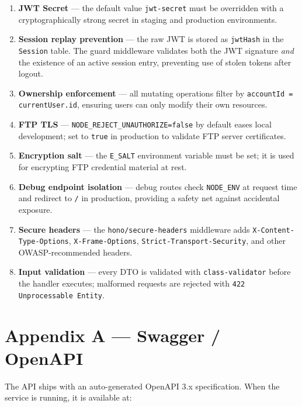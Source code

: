 \documentclass[12pt,a4paper]{article}
\begin{document}
\begin{enumerate}[label=\arabic*.]
  \item \textbf{JWT Secret} — the default value \texttt{jwt-secret} must be overridden with a cryptographically strong secret in staging and production environments.
  \item \textbf{Session replay prevention} — the raw JWT is stored as \texttt{jwtHash} in the \texttt{Session} table. The guard middleware validates both the JWT signature \emph{and} the existence of an active session entry, preventing use of stolen tokens after logout.
  \item \textbf{Ownership enforcement} — all mutating operations filter by \texttt{accountId = currentUser.id}, ensuring users can only modify their own resources.
  \item \textbf{FTP TLS} — \texttt{NODE\_REJECT\_UNAUTHORIZE=false} by default eases local development; set to \texttt{true} in production to validate FTP server certificates.
  \item \textbf{Encryption salt} — the \texttt{E\_SALT} environment variable must be set; it is used for encrypting FTP credential material at rest.
  \item \textbf{Debug endpoint isolation} — debug routes check \texttt{NODE\_ENV} at request time and redirect to \texttt{/} in production, providing a safety net against accidental exposure.
  \item \textbf{Secure headers} — the \texttt{hono/secure-headers} middleware adds \texttt{X-Content-Type-Options}, \texttt{X-Frame-Options}, \texttt{Strict-Transport-Security}, and other OWASP-recommended headers.
  \item \textbf{Input validation} — every DTO is validated with \texttt{class-validator} before the handler executes; malformed requests are rejected with \texttt{422 Unprocessable Entity}.
\end{enumerate}

\section*{Appendix A — Swagger / OpenAPI}

The API ships with an auto-generated OpenAPI 3.x specification. When the service is running, it is available at:
\end{document}
